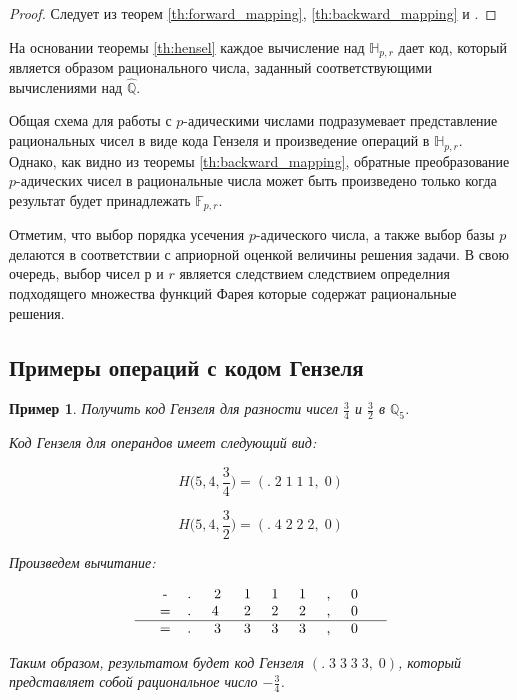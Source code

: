 \documentclass[master, och, diploma, times]{sty/SCWorks}
\theoremstyle{plain}
\newtheorem{exmp}{Пример}[section]
\theoremstyle{definition}
\numberwithin{equation}{section}
\begin{document}
\begin{proof} 
Следует из теорем \ref{th:forward_mapping}, \ref{th:backward_mapping} и \cite{bib:numbers:krishnamurthy}.
\end{proof}

На основании теоремы \ref{th:hensel} каждое вычисление над $\mathbb{H}_{p,r}$ дает код, который является образом рационального числа, заданный соответствующими вычислениями над $\hat{\mathbb{Q}}$.


Общая схема для работы с $p$-адическими числами подразумевает представление рациональных чисел в виде кода Гензеля и произведение операций в $\mathbb{H}_{p,r}$. Однако, как видно из теоремы \ref{th:backward_mapping}, обратные преобразование $p$-адических чисел в рациональные числа может быть произведено только когда результат будет принадлежать $\mathbb{F}_{p,r}$.

Отметим, что выбор порядка усечения $p$-адического числа, а также выбор базы $p$ делаются в соответствии с априорной оценкой величины решения задачи. В свою очередь, выбор чисел $р$ и $r$ является следствием следствием определния подходящего множества функций Фарея которые содержат рациональные решения.

\subsection{Примеры операций с кодом Гензеля}

\begin{exmp}
Получить код Гензеля для разности чисел $\frac{3}{4}$ и $\frac{3}{2}$ в $\mathbb{Q}_5$.

\noindent Код Гензеля для операндов имеет следующий вид:

$$H\bigg(5,4, \frac{3}{4}\bigg)=(.\; 2\; 1\; 1\; 1,\; 0)$$

$$H\bigg(5,4, \frac{3}{2}\bigg)=(.\; 4\; 2\; 2\; 2,\; 0)$$


\noindent Произведем вычитание:

$$
\begin{tabular}{ccccccccccc}
& - & .\; & 2\; & 1\; & 1\; & 1\; & ,\; & 0\; &  \\
& = & .\; & 4 \; & 2\; & 2\; & 2\; & ,\; & 0\; &  \\
\hline
& = & .\; & 3\; & 3\; & 3\; & 3\; & ,\; & 0\; &
\end{tabular}
$$


\noindent Таким образом, результатом будет код Гензеля $(.\; 3\; 3\; 3\; 3,\; 0)$, который представляет собой рациональное число $-\frac{3}{4}$.
\end{exmp}
\end{document}
